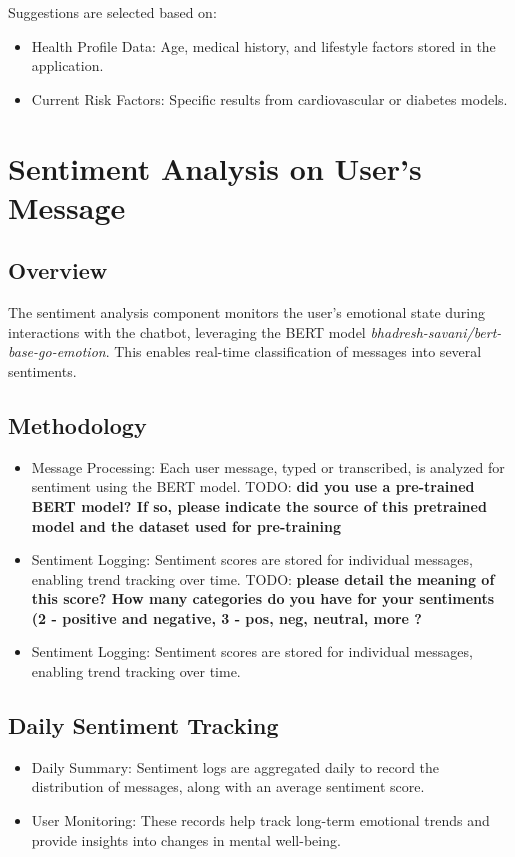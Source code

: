 \documentclass[runningheads,a4paper,11pt]{report}
\newcommand{\todoL}[1]{{\color{green} TODO: \color{green} \textbf{#1}}}
\begin{document}
Suggestions are selected based on:
\begin{itemize}
    \item Health Profile Data: Age, medical history, and lifestyle factors stored in the application.
    \item Current Risk Factors: Specific results from cardiovascular or diabetes models.
\end{itemize}

\section{Sentiment Analysis on User's Message}

\subsection{Overview}
The sentiment analysis component monitors the user's emotional state during interactions with the chatbot, leveraging the BERT model \textit{bhadresh-savani/bert-base-go-emotion}. This enables real-time classification of messages into several sentiments.

\subsection{Methodology}
\begin{itemize}
    \item Message Processing: Each user message, typed or transcribed, is analyzed for sentiment using the BERT model.
    \todoL{did you use a pre-trained BERT model? If so, please indicate the source of this pretrained model and the dataset used for pre-training}

    \item Sentiment Logging: Sentiment scores are stored for individual messages, enabling trend tracking over time.
    \todoL{please detail the meaning of this score? How many categories do you have for your sentiments (2 - positive and negative, 3 - pos, neg, neutral, more ?}

    \item Sentiment Logging: Sentiment scores are stored for individual messages, enabling trend tracking over time.
\end{itemize}

\subsection{Daily Sentiment Tracking}
\begin{itemize}
    \item Daily Summary: Sentiment logs are aggregated daily to record the distribution of messages, along with an average sentiment score.

    \item User Monitoring: These records help track long-term emotional trends and provide insights into changes in mental well-being.
\end{itemize}
\end{document}
